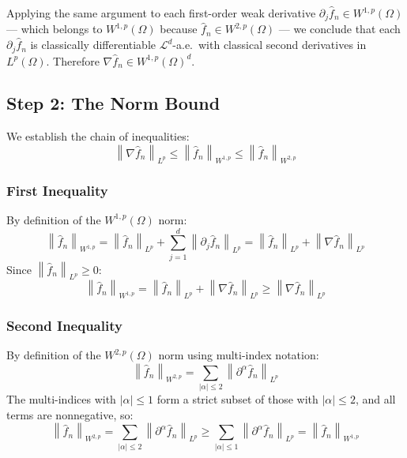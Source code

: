 \documentclass[12pt]{article}
\newcommand{\norm}[1]{\left\| #1 \right\|}
\newcommand{\fn}{\hat{f}_n}
\begin{document}
	Applying the same argument to each first-order weak derivative $\partial_j \fn
	\in W^{1,p}(\Omega)$ — which belongs to $W^{1,p}(\Omega)$ because $\fn \in
	W^{2,p}(\Omega)$ — we conclude that each $\partial_j \fn$ is classically
	differentiable $\mathcal{L}^d$-a.e.\ with classical second derivatives in
	$L^p(\Omega)$. Therefore $\nabla \fn \in W^{1,p}(\Omega)^d$.
	
	\subsection{Step 2: The Norm Bound}
	
	We establish the chain of inequalities:
	\begin{equation}
		\norm{\nabla \fn}_{L^p}
		\leq \norm{\fn}_{W^{1,p}}
		\leq \norm{\fn}_{W^{2,p}}
	\end{equation}
	
	\subsubsection*{First Inequality}
	
	By definition of the $W^{1,p}(\Omega)$ norm:
	\begin{equation}
		\norm{\fn}_{W^{1,p}}
		= \norm{\fn}_{L^p} + \sum_{j=1}^d \norm{\partial_j \fn}_{L^p}
		= \norm{\fn}_{L^p} + \norm{\nabla \fn}_{L^p}
	\end{equation}
	Since $\norm{\fn}_{L^p} \geq 0$:
	\begin{equation}
		\norm{\fn}_{W^{1,p}}
		= \norm{\fn}_{L^p} + \norm{\nabla \fn}_{L^p}
		\geq \norm{\nabla \fn}_{L^p}
	\end{equation}
	
	\subsubsection*{Second Inequality}
	
	By definition of the $W^{2,p}(\Omega)$ norm using multi-index notation:
	\begin{equation}
		\norm{\fn}_{W^{2,p}}
		= \sum_{|\alpha| \leq 2} \norm{\partial^\alpha \fn}_{L^p}
	\end{equation}
	The multi-indices with $|\alpha| \leq 1$ form a strict subset of those with
	$|\alpha| \leq 2$, and all terms are nonneg­ative, so:
	\begin{equation}
		\norm{\fn}_{W^{2,p}}
		= \sum_{|\alpha| \leq 2} \norm{\partial^\alpha \fn}_{L^p}
		\geq \sum_{|\alpha| \leq 1} \norm{\partial^\alpha \fn}_{L^p}
		= \norm{\fn}_{W^{1,p}}
	\end{equation}
	
\end{document}
